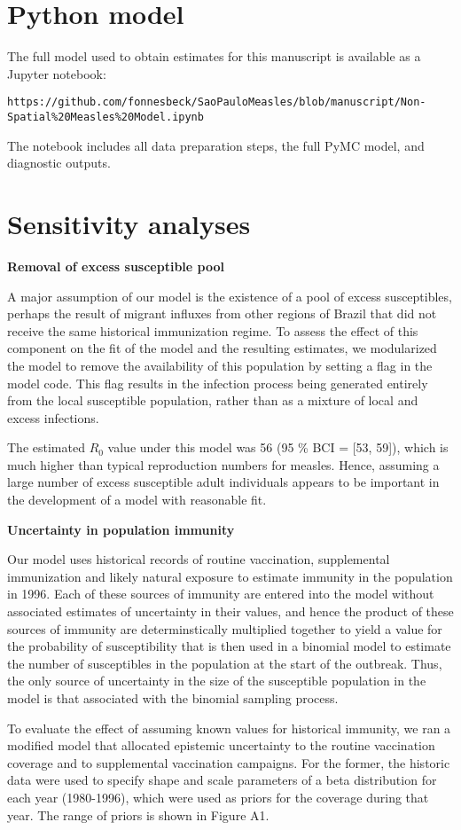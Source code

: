 \appendix

\section{Python model}

The full model used to obtain estimates for this manuscript is available as a Jupyter notebook:

\verb|https://github.com/fonnesbeck/SaoPauloMeasles/blob/manuscript/Non-Spatial%20Measles%20Model.ipynb|

The notebook includes all data preparation steps, the full PyMC model, and diagnostic outputs.

\section{Sensitivity analyses}

\textbf{Removal of excess susceptible pool}

A major assumption of our model is the existence of a pool of excess susceptibles, perhaps the result of migrant influxes from other regions of Brazil that did not receive the same historical immunization regime. To assess the effect of this component on the fit of the model and the resulting estimates, we modularized the model to remove the availability of this population by setting a flag in the model code. This flag results in the infection process being generated entirely from the local susceptible population, rather than as a mixture of local and excess infections.

The estimated $R_0$ value under this model was 56 (95 \% BCI = [53, 59]), which is much higher than typical reproduction numbers for measles. Hence, assuming a large number of excess susceptible adult individuals appears to be important in the development of a model with reasonable fit.

\textbf{Uncertainty in population immunity}

Our model uses historical records of routine vaccination, supplemental immunization and likely natural exposure to estimate immunity in the population in 1996. Each of these sources of immunity are entered into the model without associated estimates of uncertainty in their values, and hence the product of these sources of immunity are determinstically multiplied together to yield a value for the probability of susceptibility that is then used in a binomial model to estimate the number of susceptibles in the population at the start of the outbreak. Thus, the only source of uncertainty in the size of the susceptible population in the model is that associated with the binomial sampling process.

To evaluate the effect of assuming known values for historical immunity, we ran a modified model that allocated epistemic uncertainty to the routine vaccination coverage and to supplemental vaccination campaigns. For the former, the historic data were used to specify shape and scale parameters of a beta distribution for each year (1980-1996), which were used as priors for the coverage during that year. The range of priors is shown in Figure A1.